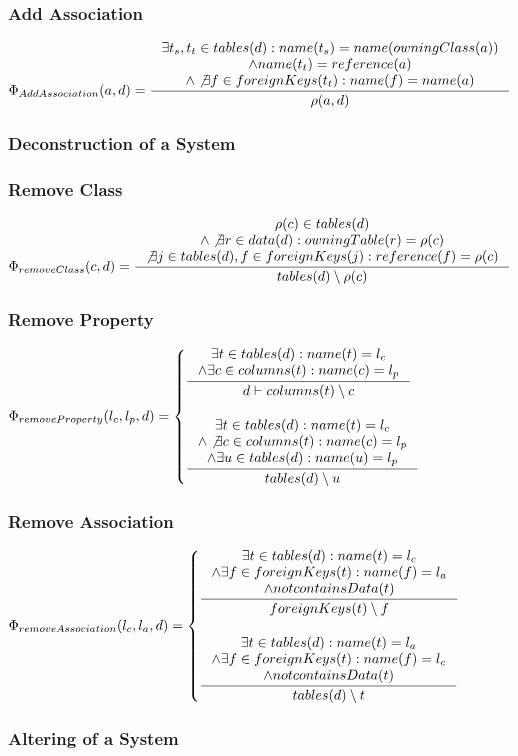 \documentclass[11pt]{article}
\begin{document}
\subsubsection{Add Association}
$
\Phi_{AddAssociation}(a, d) = \inference{ \exists t_s, t_t \in tables(d) : name(t_s) = name(owningClass(a)) \\ \wedge name(t_t) = reference(a) \\ \wedge \not \exists f \in foreignKeys(t_t) : name(f) = name(a) }{ \rho(a,d)}
$


\subsubsection{Deconstruction of a System}
\subsubsection{Remove Class}
$
\Phi_{removeClass}(c,d) = \inference{ \rho(c) \in tables(d) \\ \wedge \not \exists r \in data(d) : owningTable(r) = \rho(c) \\ \not \exists j \in tables(d), f \in foreignKeys(j) : reference(f) = \rho(c)  }{ tables(d) \setminus \rho(c)}
$

\subsubsection{Remove Property}
$
\Phi_{removeProperty}(l_c, l_p, d) = \begin{cases}
 \inference{ \exists t \in tables(d) : name(t) = l_c \\ \wedge \exists c \in columns(t) : name(c) = l_p  }{d \vdash
columns(t) \setminus c
} \\ \\
  \inference{ \exists t \in tables(d) : name(t) = l_c \\ \wedge \not \exists c \in columns(t) : name(c) = l_p \\ \wedge \exists u \in tables(d) : name(u) = l_p }{ tables(d) \setminus u }
 \end{cases}
$

\subsubsection{Remove Association}
$
\Phi_{removeAssociation}(l_c, l_a, d) =  \begin{cases}
 \inference{\exists t \in tables(d) : name(t) = l_c 
 \\ \wedge \exists f \in foreignKeys(t) : name(f) = l_a 
 \\ \wedge not containsData(t)}{ foreignKeys(t) \setminus f }
 \\ \\
 \inference{\exists t \in tables(d) : name(t) = l_a 
 \\ \wedge \exists f \in foreignKeys(t) : name(f) = l_c
 \\ \wedge not containsData(t)}{ tables(d) \setminus t}
 \end{cases}
$

\subsubsection{Altering of a System}	
\end{document}
